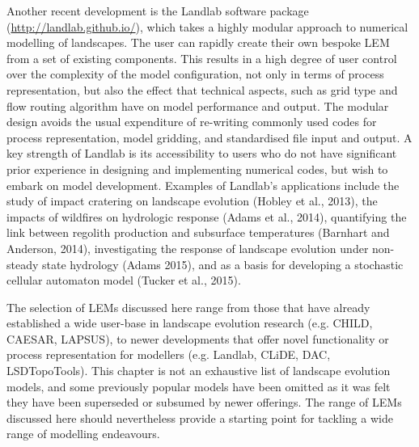 Another recent development is the Landlab software package (\url{http://landlab.github.io/}), which takes a highly modular approach to numerical modelling of landscapes. The user can rapidly create their own bespoke LEM from a set of existing components. This results in a high degree of user control over the complexity of the model configuration, not only in terms of process representation, but also the effect that technical aspects, such as grid type and flow routing algorithm have on model performance and output. The modular design avoids the usual expenditure of re-writing commonly used codes for process representation, model gridding, and standardised file input and output. A key strength of Landlab is its accessibility to users who do not have significant prior experience in designing and implementing numerical codes, but wish to embark on model development. Examples of Landlab's applications include the study of impact cratering on landscape evolution (Hobley et al., 2013), the impacts of wildfires on hydrologic response (Adams et al., 2014), quantifying the link between regolith production and subsurface temperatures (Barnhart and Anderson, 2014), investigating the response of landscape evolution under non-steady state hydrology (Adams 2015), and as a basis for developing a stochastic cellular automaton model (Tucker et al., 2015).

The selection of LEMs discussed here range from those that have already established a wide user-base in landscape evolution research (e.g. CHILD, CAESAR, LAPSUS), to newer developments that offer novel functionality or process representation for modellers (e.g. Landlab, CLiDE, DAC, LSDTopoTools). This chapter is not an exhaustive list of landscape evolution models, and some previously popular models have been omitted as it was felt they have been superseded or subsumed by newer offerings. The range of LEMs discussed here should nevertheless provide a starting point for tackling a wide range of modelling endeavours.

